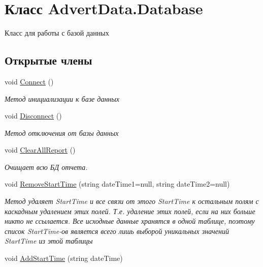 \hypertarget{class_advert_data_1_1_database}{\section{Класс Advert\+Data.\+Database}
\label{class_advert_data_1_1_database}
}


Класс для работы с базой данных  


\subsection*{Открытые члены}
\begin{DoxyCompactItemize}
\item 
void \hyperlink{class_advert_data_1_1_database_a411697c67e1f4b3b8669850e33f61cdc}{Connect} ()
\begin{DoxyCompactList}\small\item\em Метод инициализации к базе данных \end{DoxyCompactList}\item 
void \hyperlink{class_advert_data_1_1_database_a17d29da3fd0335e2bbb53ba149e71c3b}{Disconnect} ()
\begin{DoxyCompactList}\small\item\em Метод отключения от базы данных \end{DoxyCompactList}\item 
void \hyperlink{class_advert_data_1_1_database_a91140db43510a4eb52de88bf5ef34dc9}{Clear\+All\+Report} ()
\begin{DoxyCompactList}\small\item\em Очищает всю БД отчета. \end{DoxyCompactList}\item 
void \hyperlink{class_advert_data_1_1_database_a78c39f11605ed7527d1858e84e0b2334}{Remove\+Start\+Time} (string date\+Time1=null, string date\+Time2=null)
\begin{DoxyCompactList}\small\item\em Метод удаляет Start\+Time и все связи от этого Start\+Time к остальным полям с каскадным удалением этих полей. Т.\+е. удаление этих полей, если на них больше никто не ссылается. Все исходные данные хранятся в одной таблице, поэтому список Start\+Time-\/ов является всего лишь выборой уникальных значений Start\+Time из этой таблицы \end{DoxyCompactList}\item 
void \hyperlink{class_advert_data_1_1_database_a5e68ba2819a0aa1da8a266fb194c3f31}{Add\+Start\+Time} (string date\+Time)

\end{DoxyCompactItemize}

